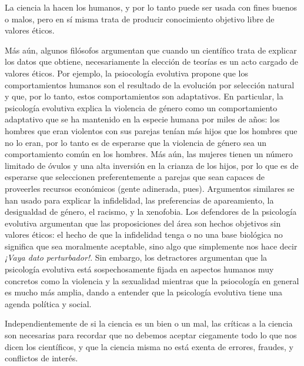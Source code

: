 \begin{remember}
    \label{rem:cienciabienomal}
    La ciencia la hacen los humanos, y por lo tanto puede ser usada con fines
    buenos o malos, pero en sí misma trata de producir conocimiento objetivo
    libre de valores éticos.
\end{remember}

Más aún, algunos filósofos argumentan que cuando un científico trata de
explicar los datos que obtiene, necesariamente la elección de teorías es un
acto cargado de valores éticos.
Por ejemplo, la psiocología evolutiva propone que los comportamientos humanos
son el resultado de la evolución por selección natural y que, por lo tanto,
estos comportamientos son adaptativos.
En particular, la psicología evolutiva explica la violencia de género como un
comportamiento adaptativo que se ha mantenido en la especie humana por miles de
años: los hombres que eran violentos con sus parejas tenían más hijos que los
hombres que no lo eran, por lo tanto es de esperarse que la violencia de género
sea un comportamiento común en los hombres.
Más aún, las mujeres tienen un número limitado de óvulos y una alta inversión
en la crianza de los hijos, por lo que es de esperarse que seleccionen
preferentemente a parejas que sean capaces de proveerles recursos económicos
(gente adinerada, pues).
Argumentos similares se han usado para explicar la infidelidad, las preferencias
de apareamiento, la desigualdad de género, el racismo, y la xenofobia.
Los defendores de la psicología evolutiva argumentan que las proposiciones del
área son hechos objetivos sin valores éticos: el hecho de que la infidelidad
tenga o no una base biológica no significa que sea moralmente aceptable,
sino algo que simplemente nos hace decir \emph{¡Vaya dato perturbador!}.
Sin embargo, los detractores argumentan que la psicología evolutiva está
sospechosamente fijada en aspectos humanos muy concretos como la violencia y la
sexualidad mientras que la psiocología en general es mucho más amplia, dando a
entender que la psicología evolutiva tiene una agenda política y social.

Independientemente de si la ciencia es un bien o un mal, las críticas a la
ciencia son necesarias para recordar que no debemos aceptar ciegamente todo lo
que nos dicen los científicos, y que la ciencia misma no está exenta de
errores, fraudes, y conflictos de interés.
